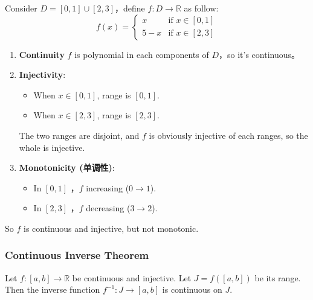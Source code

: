 \documentclass[
	UTF-8,
	11pt, %
	a4paper, %
]{LegrandOrangeBook}
\begin{document}
    \begin{example}
        Consider $D = [0, 1] \cup [2, 3]$，define $f: D \to \mathbb{R}$ as follow:
        \[
        f(x) = \begin{cases} 
        x & \text{if } x \in [0, 1] \\
        5 - x & \text{if } x \in [2, 3]
        \end{cases}
        \]
        \begin{enumerate}
            \item \textbf{Continuity} $f$ is polynomial in each components of $D$，so it's continuous。
            \item \textbf{Injectivity}: 
            \begin{itemize}[itemsep = 0.5 em, topsep = 0.5em]
                \item When $x \in [0, 1]$, range is $[0, 1]$.
                \item When $x \in [2, 3]$, range is $[2, 3]$.
            \end{itemize}
                The two ranges are disjoint, 
                and $f$ is obviously injective of each ranges, so the whole is injective.

            \item \textbf{Monotonicity (单调性)}:
            \begin{itemize}[itemsep = 0.5 em, topsep = 0.5em]
                \item In $[0, 1]$ ，$f$ increasing ($0 \to 1$).
                \item In $[2, 3]$ ，$f$ decreasing ($3 \to 2$).
            \end{itemize}
        \end{enumerate}
        So $f$ is continuous and injective, but not monotonic.
    \end{example}


    \newpage
    \subsubsection{Continuous Inverse Theorem}

    \begin{theorem}
    Let $f: [a, b] \to \mathbb{R}$ be continuous and injective. Let $J = f([a, b])$ be its range.
    Then the inverse function $f^{-1}: J \to [a, b]$ is continuous on $J$.
    \end{theorem}
\end{document}
